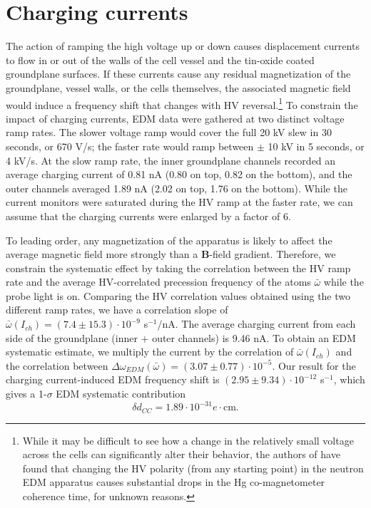 \documentclass [10pt, twoside] {uwthesis}[2012/04/02]
\begin{document}
\section{Charging currents}
The action of ramping the high voltage up or down causes displacement currents to flow in or out of the walls of the cell vessel and the tin-oxide coated groundplane surfaces. If these currents cause any residual magnetization of the groundplane, vessel walls, or the cells themselves, the associated magnetic field would induce a frequency shift that changes with HV reversal.\footnote{While it may be difficult to see how a change in the relatively small voltage across the cells can significantly alter their behavior, the authors of \cite{2006_ILL_nEDM} have found that changing the HV polarity (from any starting point) in the neutron EDM apparatus causes substantial drops in the Hg co-magnetometer coherence time, for unknown reasons.} To constrain the impact of charging currents, EDM data were gathered at two distinct voltage ramp rates. The slower voltage ramp would cover the full 20 kV slew in 30 seconds, or 670 V/s; the faster rate would ramp between $\pm$ 10 kV in 5 seconds, or 4 kV/s. At the slow ramp rate, the inner groundplane channels recorded an average charging current of 0.81 nA (0.80 on top, 0.82 on the bottom), and the outer channels averaged 1.89 nA (2.02 on top, 1.76 on the bottom). While the current monitors were saturated during the HV ramp at the faster rate, we can assume that the charging currents were enlarged by a factor of 6. 

To leading order, any magnetization of the apparatus is likely to affect the average magnetic field more strongly than a $\mathbf{B}$-field gradient. Therefore, we constrain the systematic effect by taking the correlation between the HV ramp rate and the average HV-correlated precession frequency of the atoms $\bar{\omega}$ while the probe light is on. Comparing the HV correlation values obtained using the two different ramp rates, we have a correlation slope of $\bar{\omega}(I_{ch}) = (7.4 \pm 15.3) \cdot 10^{-9}$ s$^{-1}$/nA. The average charging current from each side of the groundplane (inner + outer channels) is 9.46 nA. To obtain an EDM systematic estimate, we multiply the current by the correlation of $\bar{\omega}(I_{ch})$ and the correlation between $\Delta\omega_{EDM}(\bar{\omega}) = (3.07 \pm 0.77) \cdot 10^{-5}$. Our result for the charging current-induced EDM frequency shift is $(2.95 \pm 9.34) \cdot 10^{-12}$ s$^{-1}$, which gives a 1-$\sigma$ EDM systematic contribution 
\begin{equation}
\delta d_{CC} = 1.89 \cdot 10^{-31} e\cdot \text{cm}.
\end{equation}
\end{document}
